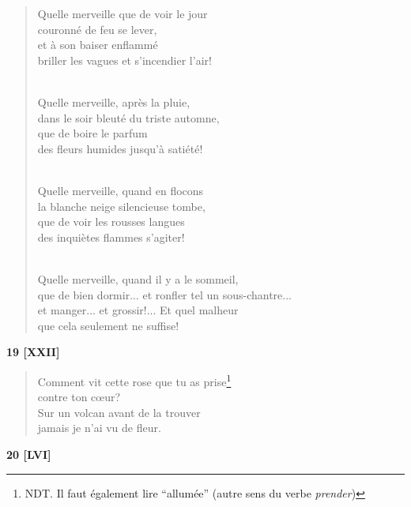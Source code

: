 \documentclass[a4paper,12pt]{book}
\begin{document}
\begin{verse}
Quelle merveille que de voir le jour \\
couronné de feu se lever, \\
et à son baiser enflammé \\
briller les vagues et s'incendier l'air! \\ \

Quelle merveille, après la pluie, \\
dans le soir bleuté du triste automne, \\
que de boire le parfum \\
des fleurs humides jusqu'à satiété! \\ \

Quelle merveille, quand en flocons \\
la blanche neige silencieuse tombe, \\
que de voir les rousses langues \\
des inquiètes flammes s'agiter! \\ \

Quelle merveille, quand il y a le sommeil, \\
que de bien dormir... et ronfler tel un sous-chantre... \\
et manger... et grossir!... Et quel malheur \\
que cela seulement ne suffise! \\
\end{verse}

\bigskip

\begin{center} {\bf 19 [XXII]} \end{center}

\begin{verse}
Comment vit cette rose que tu as prise\footnote{NDT. Il faut également lire ``allumée'' (autre sens du verbe {\em prender})} \\
contre ton c{\oe}ur? \\
Sur un volcan avant de la trouver \\
jamais je n'ai vu de fleur. \\
\end{verse}

\bigskip

\begin{center} {\bf 20 [LVI]} \end{center}
\end{document}
